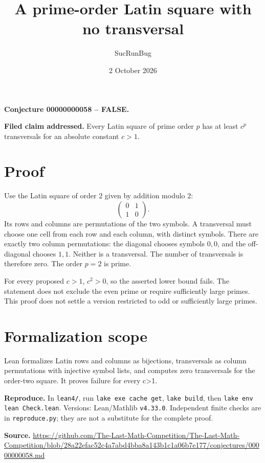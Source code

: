 \documentclass[11pt]{article}
\title{A prime-order Latin square with no transversal}
\author{SucRunBug}
\date{2 October 2026}
\begin{document}
\maketitle
\textbf{Conjecture 00000000058 -- FALSE.}

\textbf{Filed claim addressed.} Every Latin square of prime order $p$ has at least $c^p$ transversals for an absolute constant $c>1$.

\section*{Proof}
Use the Latin square of order $2$ given by addition modulo $2$:
\[\begin{pmatrix}0&1\\1&0\end{pmatrix}.\]
Its rows and columns are permutations of the two symbols. A transversal must choose one cell from each row and each column, with distinct symbols. There are exactly two column permutations: the diagonal chooses symbols $0,0$, and the off-diagonal chooses $1,1$. Neither is a transversal. The number of transversals is therefore zero. The order $p=2$ is prime.

For every proposed $c>1$, $c^2>0$, so the asserted lower bound fails. The statement does not exclude the even prime or require sufficiently large primes. This proof does not settle a version restricted to odd or sufficiently large primes.

\section*{Formalization scope}
Lean formalizes Latin rows and columns as bijections, transversals as column permutations with injective symbol lists, and computes zero transversals for the order-two square. It proves failure for every c>1.

\textbf{Reproduce.} In \texttt{lean4/}, run \texttt{lake exe cache get},
\texttt{lake build}, then \texttt{lake env lean Check.lean}. Versions:
Lean/Mathlib \texttt{v4.33.0}. Independent finite checks are in
\texttt{reproduce.py}; they are not a substitute for the complete proof.

\textbf{Source.} \url{https://github.com/The-Last-Math-Competition/The-Last-Math-Competition/blob/28a22efac52c4a7abd4bba8a143b1c1a06b7e177/conjectures/00000000058.md}
\end{document}
